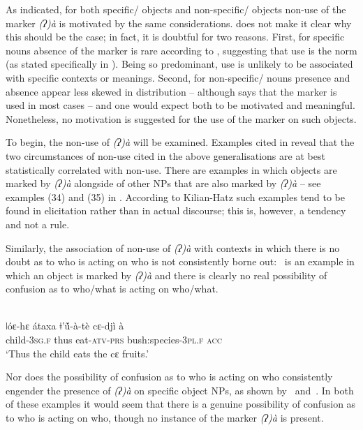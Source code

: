 \documentclass[output=paper]{LSP/langsci}
\begin{document}
As indicated, for both specific/ objects and non-specific/ objects non-use of the marker \textit{(ʔ)à} is motivated by the same considerations. \citet{Kilian-Hatz2008Grammar} does not make it clear why this should be the case; in fact, it is doubtful for two reasons. First, for specific nouns absence of the marker is rare according to , suggesting that use is the norm (as stated specifically in \citealt[372]{Kilian-Hatz2013Kxoe}). Being so predominant, use is unlikely to be associated with specific contexts or meanings. Second, for non-specific/ nouns presence and absence appear less skewed in distribution – although \citet[371]{Kilian-Hatz2013Kxoe} says that the marker is used in most cases – and one would expect both to be motivated and meaningful. Nonetheless, no motivation is suggested for the use of the marker on such objects.


To begin, the non-use of \textit{(ʔ)à} will be examined. Examples cited in \citet{Kilian-Hatz2008Grammar,Kilian-Hatz2013Kxoe} reveal that the two circumstances of non-use cited in the above generalisations are at best statistically correlated with non-use. There are examples in which objects are marked by \textit{(ʔ)à} alongside of other NPs that are also marked by \textit{(ʔ)à} – see examples (34) and (35) in \citet[52]{Kilian-Hatz2008Grammar}. According to Kilian-Hatz such examples tend to be found in elicitation rather than in actual discourse; this is, however, a tendency and not a rule.

Similarly, the association of non-use of \textit{(ʔ)à} with contexts in which there is no doubt as to who is acting on who is not consistently borne out:~ is an example in which an object is marked by \textit{(ʔ)à} and there is clearly no real possibility of confusion as to who/what is acting on who/what.

\ea {}\\ \label{09-mc-ex:31}
\gll ǀóɛ-hɛ átaxa 	ǂ’ṹ-à-tè  cɛ-djì  à\\
child-3\textsc{sg.f} thus eat-\textsc{atv}-\textsc{prs} bush:species-3\textsc{pl.f} \textsc{acc}\\
\glt ‘Thus the child eats the cɛ fruits.’
\z

Nor does the possibility of confusion as to who is acting on who consistently engender the presence of \textit{(ʔ)à} on specific object NPs, as shown by~ and~. In both of these examples it would seem that there is a genuine possibility of confusion as to who is acting on who, though no instance of the marker \textit{(ʔ)à} is present.
\end{document}
